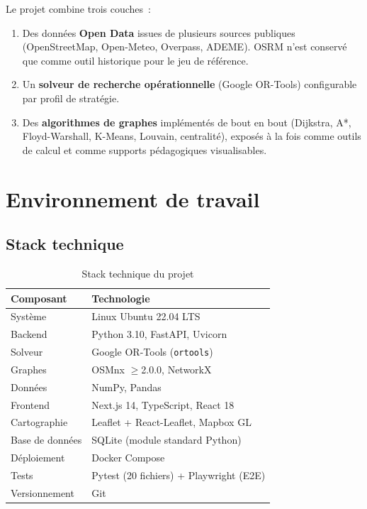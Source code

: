 \documentclass[a4paper, 12pt, twoside]{article}
\begin{document}
Le projet combine trois couches~:
\begin{enumerate}
  \item Des donn\'{e}es \textbf{Open Data} issues de plusieurs sources publiques
        (OpenStreetMap, Open-Meteo, Overpass, ADEME). OSRM n'est conserv\'{e}
        que comme outil historique pour le jeu de r\'{e}f\'{e}rence.
  \item Un \textbf{solveur de recherche op\'{e}rationnelle} (Google OR-Tools) configurable par profil
        de strat\'{e}gie.
  \item Des \textbf{algorithmes de graphes} impl\'{e}ment\'{e}s de bout en bout (Dijkstra, A*,
        Floyd-Warshall, K-Means, Louvain, centralit\'{e}), expos\'{e}s \`{a} la fois comme outils de
        calcul et comme supports p\'{e}dagogiques visualisables.
\end{enumerate}

\section{Environnement de travail}

\subsection{Stack technique}

\begin{table}[h]
  \begin{center}
    \begin{tabular}{|l|l|}
      \hline
      \textbf{Composant} & \textbf{Technologie} \\
      \hline
      Syst\`{e}me & Linux Ubuntu 22.04 LTS \\
      Backend & Python 3.10, FastAPI, Uvicorn \\
      Solveur & Google OR-Tools (\texttt{ortools}) \\
      Graphes & OSMnx $\geq$2.0.0, NetworkX \\
      Donn\'{e}es & NumPy, Pandas \\
      Frontend & Next.js 14, TypeScript, React 18 \\
      Cartographie & Leaflet + React-Leaflet, Mapbox GL \\
      Base de donn\'{e}es & SQLite (module standard Python) \\
      D\'{e}ploiement & Docker Compose \\
      Tests & Pytest (20 fichiers) + Playwright (E2E) \\
      Versionnement & Git \\
      \hline
    \end{tabular}
  \end{center}
  \caption{Stack technique du projet}
  \label{tab:stack}
\end{table}
\end{document}
